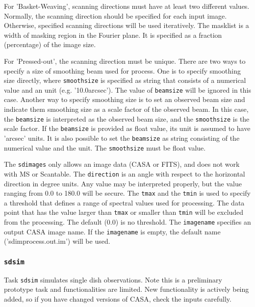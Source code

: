         For 'Basket-Weaving', scanning directions must have at least two 
        different values. Normally, the scanning direction should be 
        specified for each input image. Otherwise, specified scanning 
        directions will be used iteratively. The masklist is a width of 
        masking region in the Fourier plane. It is specified as a fraction 
        (percentage) of the image size. 

        For 'Pressed-out', the scanning direction must be unique. There are 
        two ways to specify a size of smoothing beam used for process. One 
        is to specify smoothing size directly, where {\tt smoothsize} is specified
        as string that consists of a numerical value and an unit 
        (e.g. '10.0arcsec'). The value of {\tt beamsize} will be ignored in this case. 
        Another way to specify smoothing size is to set an observed beam size 
        and indicate them smoothing size as a scale factor of the observed beam.
        In this case, the {\tt beamsize} is interpreted as the observed beam 
        size, and the {\tt smoothsize} is the scale factor. If the {\tt beamsize} is 
        provided as float value, its unit is assumed to have 'arcsec' units. It is also 
        possible to set the {\tt beamsize} as string consisting of the numerical 
        value and the unit. The {\tt smoothsize} must be float value.

        The {\tt sdimages} only allows an image data (CASA or FITS), and does
        not work with MS or Scantable. The {\tt direction} is an angle with respect 
        to the horizontal direction in degree units. Any value may be 
        interpreted properly, but the value ranging from 0.0 to 180.0 will be 
        secure. The {\tt tmax} and the {\tt tmin} is used to specify a threshold that 
        defines a range of spectral values used for processing. The data point 
        that has the value larger than {\tt tmax} or smaller than {\tt tmin} will be 
        excluded from the processing. The default (0.0) is no threshold. 
        The {\tt imagename} specifies an output CASA image name. If the {\tt imagename} 
        is empty, the default name ('sdimprocess.out.im') will be used. 

\subsubsection{{\tt sdsim}}
\label{section:sd.sdtasks.tasks.sdsim}

   Task {\tt sdsim} simulates single dish observations. Note this is a 
   preliminary prototype task and functionalities are limited. 
   New functionality is actively  being added, so if you have changed 
   versions of CASA, check the inputs carefully.


